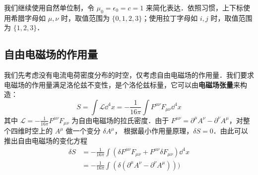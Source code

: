 

我们继续使用自然单位制，令 $\mu_0=\epsilon_0=c=1$ 来简化表达．依照习惯，上下标使用希腊字母如 $\mu, \nu$ 时，取值范围为 $\{0, 1, 2, 3\}$；使用拉丁字母如 $i, j$ 时，取值范围为 $\{1, 2, 3\}$．

\subsection{自由电磁场的作用量}
我们先考虑没有电流电荷密度分布的时空，仅考虑自由电磁场的作用量．我们要求电磁场的作用量满足洛伦兹不变性，是个洛伦兹标量，它可以由\textbf{电磁场张量}来构造：
\begin{equation}
S=\int {\mathcal L} {\dd}^4 x=-\frac{1}{16\pi}\int F^{\mu\nu}F_{\mu\nu}{\dd}^4 x 
\end{equation}
其中 $\mathcal L=-\frac{1}{16\pi}F^{\mu\nu}F_{\mu\nu}$ 为自由电磁场的拉氏密度．由于 $F^{\mu\nu}=\partial^\mu A^\nu -\partial^\nu A^\mu$，对整个四维时空上的 $A^\mu$ 做一个变分 $\delta A^\mu$，
根据最小作用量原理，$\delta S=0$．由此可以推出自由电磁场的变化方程
\begin{equation}
\begin{aligned}
\delta S&=-\frac{1}{16\pi}\int (\delta F^{\mu\nu}F_{\mu\nu}+F^{\mu\nu}\delta F_{\mu\nu}){\dd}^4 x\\
&=-\frac{1}{16\pi}\int (\delta (\partial^\mu A^\nu-\partial^\nu A^\mu)))
\end{aligned}
\end{equation}